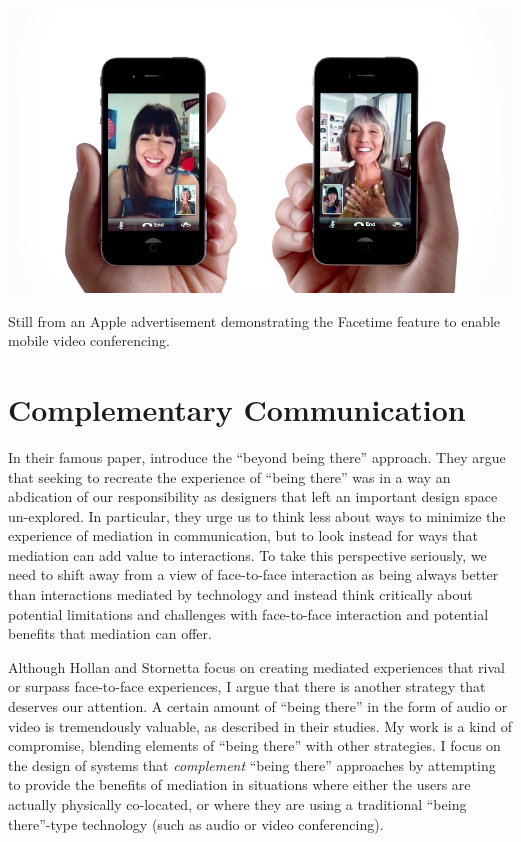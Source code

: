 \begin{marginfigure}
	\includegraphics{figures/iphone-face-to-face.png}
	\caption{Still from an Apple advertisement demonstrating the Facetime feature to enable mobile video conferencing.}
	\label{fig:facetime}
\end{marginfigure}




\section{Complementary Communication}
In their famous paper, \citet{Hollan:1992tz} introduce the ``beyond being there'' approach. They argue that seeking to recreate the experience of ``being there'' was in a way an abdication of our responsibility as designers that left an important design space un-explored. In particular, they urge us to think less about ways to minimize the experience of mediation in communication, but to look instead for ways that mediation can add value to interactions. To take this perspective seriously, we need to shift away from a view of face-to-face interaction as being always better than interactions mediated by technology and instead think critically about potential limitations and challenges with face-to-face interaction and potential benefits that mediation can offer. 

Although Hollan and Stornetta focus on creating mediated experiences that rival or surpass face-to-face experiences, I argue that there is another  strategy that deserves our attention. A certain amount of ``being there'' in the form of audio or video is tremendously valuable, as \citet{Ochsman:1974vu} described in their studies. My work is a kind of compromise, blending elements of ``being there'' with other strategies. I focus on the design of systems that \emph{complement} ``being there'' approaches by attempting to provide the benefits of mediation in situations where either the users are actually physically co-located, or where they are using a traditional ``being there''-type technology (such as audio or video conferencing).

